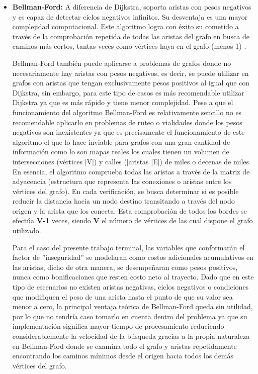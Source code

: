 \begin{itemize}
    \item \textbf{Bellman-Ford:} A diferencia de Dijkstra, soporta aristas con pesos negativos y es capaz de detectar ciclos negativos infinitos. Su desventaja es una mayor complejidad computacional. Este algoritmo logra con éxito su cometido a través de la comprobación repetida de todas las aristas del grafo en busca de caminos más cortos, tantas veces como vértices haya en el grafo (menos 1) \cite{w3sch_bellmanford}. 

    Bellman-Ford también puede aplicarse a problemas de grafos donde no necesariamente hay aristas con pesos negativos, es decir, se puede utilizar en grafos con aristas que tengan exclusivamente pesos positivos al igual que con Dijkstra, sin embargo, para este tipo de casos es más recomendable utilizar Dijkstra ya que es más rápido y tiene menor complejidad. Pese a que el funcionamiento del algoritmo Bellman-Ford es relativamente sencillo no es recomendable aplicarlo en problemas de ruteo o vialidades donde los pesos negativos son inexistentes ya que es precisamente el funcionamiento de este algoritmo el que lo hace inviable para grafos con una gran cantidad de información como lo son mapas reales los cuales tienen un volumen de intersecciones (vértices |V|) y calles (|aristas |E|) de miles o decenas de miles. En esencia, el algoritmo comprueba todas las aristas a través de la matriz de adyacencia (estructura que representa las conexiones o aristas entre los vértices del grafo). En cada verificación, se busca determinar si es posible reducir la distancia hacia un nodo destino transitando a través del nodo origen y la arista que los conecta. Esta comprobación de todos los bordes se efectúa \textbf{V-1} veces, siendo \textbf{V} el número de vértices de las cual dispone el grafo utilizado. 

    Para el caso del presente trabajo terminal, las variables que conformarán el factor de ''inseguridad'' se modelaran como costos adicionales acumulativos en las aristas, dicho de otra manera, se desempeñaran como pesos positivos, nunca como bonificaciones que resten costo neto al trayecto. Dado que en este tipo de escenarios no existen aristas negativas, ciclos negativos o condiciones que modifiquen el peso de una arista hasta el punto de que su valor sea menor a cero, la principal ventaja teórica de Bellman-Ford queda sin utilidad, por lo que no tendría caso tomarlo en cuenta dentro del problema ya que su implementación significa mayor tiempo de procesamiento reduciendo considerablemente la velocidad de la búsqueda gracias a la propia naturaleza en Bellman-Ford donde se examina todo el grafo y aristas repetidamente encontrando los caminos mínimos desde el origen hacia todos los demás vértices del grafo.


\end{itemize}
